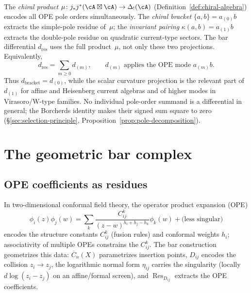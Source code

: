 \begin{convention}
\label{conv:product-vs-bracket}
The \emph{chiral product}
$\mu \colon j_* j^*(\cA \boxtimes \cA) \to \Delta_!(\cA)$
(Definition~\ref{def:chiral-algebra}) encodes all OPE pole
orders simultaneously. The \emph{chiral bracket}
$\{a,b\} = a_{(0)}b$ extracts the simple-pole residue of~$\mu$;
the \emph{invariant pairing} $\kappa(a,b) = a_{(1)}b$ extracts
the double-pole residue on quadratic current-type sectors.
The bar differential $d_{\mathrm{res}}$ uses the full product~$\mu$,
not only these two projections. Equivalently,
\[
d_{\mathrm{res}}=\sum_{m\ge0} d_{(m)},\qquad
d_{(m)}\text{ applies the OPE mode }a_{(m)}b.
\]
Thus $d_{\mathrm{bracket}}=d_{(0)}$, while the scalar curvature
projection is the relevant part of $d_{(1)}$ for affine and
Heisenberg current algebras and of higher modes in Virasoro/W-type
families. No individual pole-order summand is a differential in
general; the Borcherds identity makes their signed sum square to zero
(\S\ref{sec:selection-principle},
Proposition~\ref{prop:pole-decomposition}).
\end{convention}

\section{The geometric bar complex}
\label{sec:bar-cobar}

\subsection{OPE coefficients as residues}

\begin{remark}\label{rem:physical-genesis}
In two-dimensional conformal field theory, the operator product expansion (OPE)
\[\phi_i(z)\phi_j(w) = \sum_{k} \frac{C_{ij}^k}{(z-w)^{h_i+h_j-h_k}} \phi_k(w) + \text{(less singular)}\]
encodes the structure constants $C_{ij}^k$ (fusion rules) and conformal weights $h_i$; associativity of multiple OPEs constrains the $C_{ij}^k$.
The bar construction geometrizes this data: $\overline{C}_n(X)$ parametrizes insertion points, $D_{ij}$ encodes the collision $z_i \to z_j$, the logarithmic normal form \(\eta_{ij}\) carries the singularity (locally \(d\log(z_i-z_j)\) on an affine/formal screen), and $\operatorname{Res}_{D_{ij}}$ extracts the OPE coefficients.
\end{remark}

